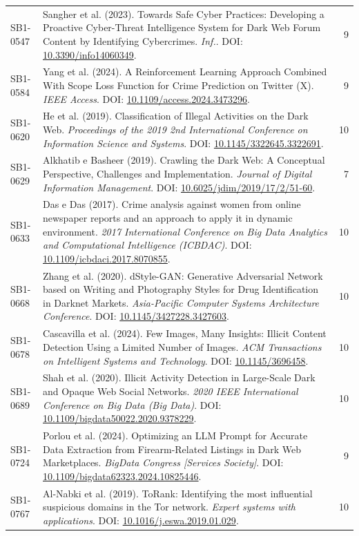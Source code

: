 \begin{small}
\begin{longtable}{lp{11.2cm}r}
SB1-0547 & Sangher et al. (2023). Towards Safe Cyber Practices: Developing a Proactive Cyber-Threat Intelligence System for Dark Web Forum Content by Identifying Cybercrimes. \textit{Inf.}. DOI: \url{10.3390/info14060349}. & 9 \\
SB1-0584 & Yang et al. (2024). A Reinforcement Learning Approach Combined With Scope Loss Function for Crime Prediction on Twitter (X). \textit{IEEE Access}. DOI: \url{10.1109/access.2024.3473296}. & 9 \\
SB1-0620 & He et al. (2019). Classification of Illegal Activities on the Dark Web. \textit{Proceedings of the 2019 2nd International Conference on Information Science and Systems}. DOI: \url{10.1145/3322645.3322691}. & 10 \\
SB1-0629 & Alkhatib e Basheer (2019). Crawling the Dark Web: A Conceptual Perspective, Challenges and Implementation. \textit{Journal of Digital Information Management}. DOI: \url{10.6025/jdim/2019/17/2/51-60}. & 7 \\
SB1-0633 & Das e Das (2017). Crime analysis against women from online newspaper reports and an approach to apply it in dynamic environment. \textit{2017 International Conference on Big Data Analytics and Computational Intelligence (ICBDAC)}. DOI: \url{10.1109/icbdaci.2017.8070855}. & 10 \\
SB1-0668 & Zhang et al. (2020). dStyle-GAN: Generative Adversarial Network based on Writing and Photography Styles for Drug Identification in Darknet Markets. \textit{Asia-Pacific Computer Systems Architecture Conference}. DOI: \url{10.1145/3427228.3427603}. & 10 \\
SB1-0678 & Cascavilla et al. (2024). Few Images, Many Insights: Illicit Content Detection Using a Limited Number of Images. \textit{ACM Transactions on Intelligent Systems and Technology}. DOI: \url{10.1145/3696458}. & 10 \\
SB1-0689 & Shah et al. (2020). Illicit Activity Detection in Large-Scale Dark and Opaque Web Social Networks. \textit{2020 IEEE International Conference on Big Data (Big Data)}. DOI: \url{10.1109/bigdata50022.2020.9378229}. & 10 \\
SB1-0724 & Porlou et al. (2024). Optimizing an LLM Prompt for Accurate Data Extraction from Firearm-Related Listings in Dark Web Marketplaces. \textit{BigData Congress [Services Society]}. DOI: \url{10.1109/bigdata62323.2024.10825446}. & 9 \\
SB1-0767 & Al-Nabki et al. (2019). ToRank: Identifying the most influential suspicious domains in the Tor network. \textit{Expert systems with applications}. DOI: \url{10.1016/j.eswa.2019.01.029}. & 10 \\

\end{longtable}
\end{small}
